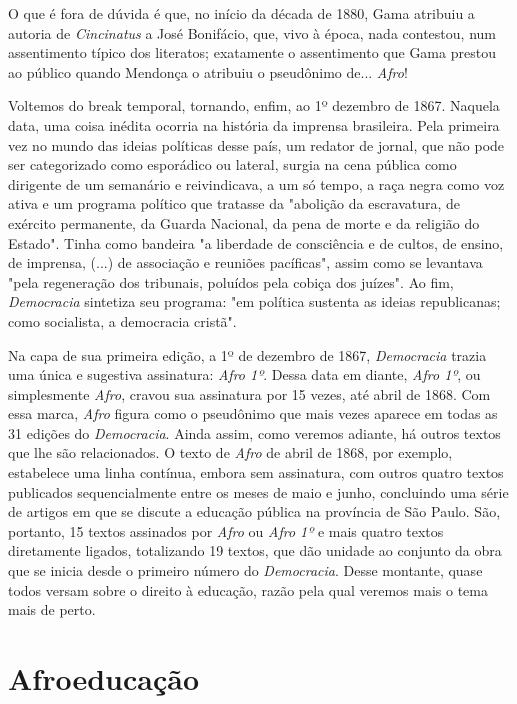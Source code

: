 O que é fora de dúvida é que, no início da década de 1880, Gama atribuiu
a autoria de \emph{Cincinatus} a José Bonifácio, que, vivo à época, nada
contestou, num assentimento típico dos literatos; exatamente o
assentimento que Gama prestou ao público quando Mendonça o atribuiu o
pseudônimo de... \emph{Afro}!

Voltemos do break temporal, tornando, enfim, ao 1º dezembro de 1867.
Naquela data, uma coisa inédita ocorria na história da imprensa
brasileira. Pela primeira vez no mundo das ideias políticas desse país,
um redator de jornal, que não pode ser categorizado como esporádico ou
lateral, surgia na cena pública como dirigente de um semanário e
reivindicava, a um só tempo, a raça negra como voz ativa e um programa
político que tratasse da "abolição da escravatura, de exército
permanente, da Guarda Nacional, da pena de morte e da religião do
Estado". Tinha como bandeira "a liberdade de consciência e de cultos, de
ensino, de imprensa, (...) de associação e reuniões pacíficas", assim
como se levantava "pela regeneração dos tribunais, poluídos pela
cobiça dos juízes". Ao fim, \emph{Democracia} sintetiza seu programa:
"em política sustenta as ideias republicanas; como socialista, a
democracia cristã".

Na capa de sua primeira edição, a 1º de dezembro de 1867,
\emph{Democracia} trazia uma única e sugestiva assinatura: \emph{Afro
1º}. Dessa data em diante, \emph{Afro 1º}, ou simplesmente \emph{Afro},
cravou sua assinatura por 15 vezes, até abril de 1868. Com essa marca,
\emph{Afro} figura como o pseudônimo que mais vezes aparece em todas as
31 edições do \emph{Democracia}. Ainda assim, como veremos adiante, há
outros textos que lhe são relacionados. O texto de \emph{Afro} de abril
de 1868, por exemplo, estabelece uma linha contínua, embora sem
assinatura, com outros quatro textos publicados sequencialmente entre os
meses de maio e junho, concluindo uma série de artigos em que se discute
a educação pública na província de São Paulo. São, portanto, 15 textos
assinados por \emph{Afro} ou \emph{Afro 1º} e mais quatro textos
diretamente ligados, totalizando 19 textos, que dão unidade ao conjunto
da obra que se inicia desde o primeiro número do \emph{Democracia}.
Desse montante, quase todos versam sobre o direito à educação, razão
pela qual veremos mais o tema mais de perto.

\section{Afroeducação}

